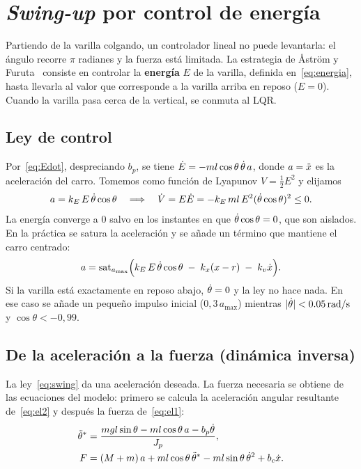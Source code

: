\section{\emph{Swing-up} por control de energía}
\label{sec:swingup}

Partiendo de la varilla colgando, un controlador lineal no puede levantarla: el ángulo recorre $\pi$ radianes y la fuerza está limitada. La estrategia de Åström y Furuta~\cite{astrom2000} consiste en controlar la \textbf{energía} $E$ de la varilla, definida en~\eqref{eq:energia}, hasta llevarla al valor que corresponde a la varilla arriba en reposo ($E=0$). Cuando la varilla pasa cerca de la vertical, se conmuta al LQR.

\subsection{Ley de control}

Por~\eqref{eq:Edot}, despreciando $b_p$, se tiene $\dot E=-ml\cos\theta\,\dot{\theta}\,a$, donde $a=\ddot{x}$ es la aceleración del carro. Tomemos como función de Lyapunov $V=\tfrac12E^2$ y elijamos
\begin{equation}
a = k_E\,E\,\dot{\theta}\cos\theta \quad\Longrightarrow\quad
\dot V = E\dot E = -k_E\,ml\,E^2(\dot{\theta}\cos\theta)^2 \le 0 .
\end{equation}
La energía converge a $0$ salvo en los instantes en que $\dot{\theta}\cos\theta=0$, que son aislados. En la práctica se satura la aceleración y se añade un término que mantiene el carro centrado:
\begin{equation}
a = \operatorname{sat}_{a_{\max}}\!\Big(k_E\,E\,\dot{\theta}\cos\theta \;-\; k_{x}(x-r) \;-\; k_v\dot{x}\Big).
\label{eq:swing}
\end{equation}
Si la varilla está exactamente en reposo abajo, $\dot{\theta}=0$ y la ley no hace nada. En ese caso se añade un pequeño impulso inicial ($0{,}3\,a_{\max}$) mientras $|\dot{\theta}|<\SI{0.05}{rad/s}$ y $\cos\theta<-0{,}99$.

\subsection{De la aceleración a la fuerza (dinámica inversa)}

La ley~\eqref{eq:swing} da una aceleración deseada. La fuerza necesaria se obtiene de las ecuaciones del modelo: primero se calcula la aceleración angular resultante de~\eqref{eq:el2} y después la fuerza de~\eqref{eq:el1}:
\begin{align}
\ddot{\theta}^\ast &= \frac{mgl\sin\theta - ml\cos\theta\,a - b_p\dot{\theta}}{J_p},\\
F &= (M+m)\,a + ml\cos\theta\,\ddot{\theta}^\ast - ml\sin\theta\,\dot{\theta}^2 + b_c\dot{x} .
\end{align}

